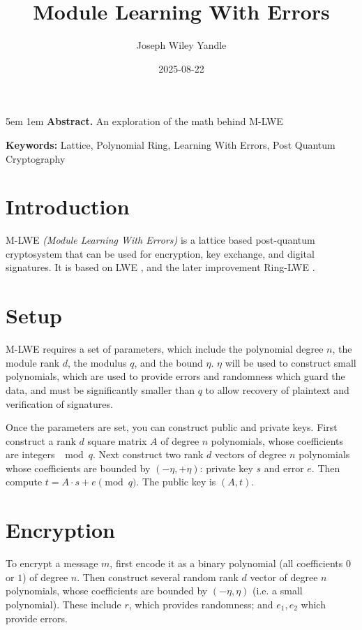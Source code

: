 \documentclass{article}
\title{Module Learning With Errors}
\date{2025-08-22}
\author{Joseph Wiley Yandle}
\begin{document}
\onecolumn
\maketitle

\begingroup
\leftskip5em
\parskip1em
\rightskip\leftskip
\noindent\textbf{Abstract.} An exploration of the math behind M-LWE

\par
\noindent\textbf{Keywords:} Lattice, Polynomial Ring, Learning With Errors, Post Quantum Cryptography
\par
\endgroup

\section{
  Introduction
}

M-LWE \emph{(Module Learning With Errors)} is a lattice based post-quantum cryptosystem that can be used for encryption, key exchange, and digital signatures.  It is based on LWE \cite{lwe}, and the later improvement Ring-LWE \cite{ring-lwe}.

\section{
  Setup
}

M-LWE requires a set of parameters, which include the polynomial degree $n$, the module rank $d$, the modulus $q$, and the bound $\eta$.  $\eta$ will be used to construct small polynomials, which are used to provide errors and randomness which guard the data, and must be significantly smaller than $q$ to allow recovery of plaintext and verification of signatures.

Once the parameters are set, you can construct public and private keys.  First construct a rank $d$ square matrix $A$ of degree $n$ polynomials, whose coefficients are integers $\mod{q}$.  Next construct two rank $d$ vectors of degree $n$ polynomials whose coefficients are bounded by $(-\eta, +\eta)$: private key $s$ and error $e$.  Then compute $t = A \cdot s + e \pmod{q}$.  The public key is $(A, t)$.

\newpage
\section{
  Encryption
}

To encrypt a message $m$, first encode it as a binary polynomial (all coefficients $0$ or $1$) of degree $n$.  Then construct several random rank $d$ vector of degree $n$ polynomials, whose coefficients are bounded by $(-\eta, \eta)$ (i.e. a small polynomial).  These include $r$, which provides randomness; and $e_1, e_2$ which provide errors.
\end{document}
